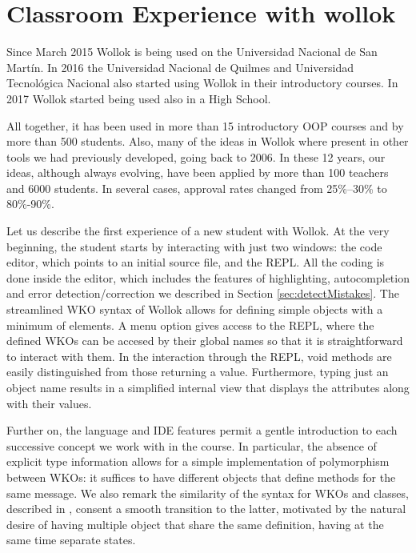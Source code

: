 \section{Classroom Experience with wollok}
\label{sec:experience}

Since March 2015 Wollok is being used on the Universidad Nacional de San Martín. 
In 2016 the Universidad Nacional de Quilmes and Universidad Tecnológica Nacional also started using Wollok in their introductory courses.
In 2017 Wollok started being used also in a High School. 

All together, it has been used in more than 15 introductory OOP courses and by more than 500 students.
Also, many of the ideas in Wollok where present in other tools we had previously developed, going back to 2006. In these 12 years, our ideas, although always evolving, have been applied by more than 100 teachers and 6000 students. 
In several cases, approval rates changed from 25\%--30\% to 80\%-90\%.

Let us describe the first experience of a new student with Wollok.
At the very beginning, the student starts by interacting with just two windows: the code editor, which points to an initial source file, and the REPL.
All the coding is done inside the editor, which includes the features of highlighting, autocompletion and error detection/correction we described in Section \ref{sec:detectMistakes}. The streamlined WKO syntax of Wollok allows for defining simple objects with a minimum of elements. A menu option gives access to the REPL, where the defined WKOs can be accesed by their global names so that it is straightforward to interact with them. In the interaction through the REPL, void methods are easily distinguished from those returning a value. Furthermore, typing just an object name results in a simplified internal view that displays the attributes along with their values.

Further on, the language and IDE features permit a gentle introduction to each successive concept we work with in the course. 
In particular, the absence of explicit type information allows for a simple implementation of polymorphism between WKOs: it suffices to have different objects that define methods for the same message.
We also remark the similarity of the syntax for WKOs and classes, described in , consent a smooth transition to the latter, motivated by the natural desire of having multiple object that share the same definition, having at the same time separate states.

